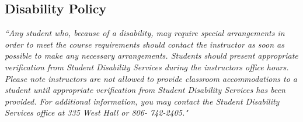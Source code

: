\documentclass[12pt]{article}
\begin{document}
\subsection*{Disability Policy}
\textsl{ ``Any student who, because of a disability, may require special arrangements in order to meet
the course requirements should contact the instructor as soon as possible to make any necessary arrangements.
Students should present appropriate verification from Student Disability Services during the instructors office hours. Please note instructors are not allowed to provide classroom accommodations
to a student until appropriate verification from Student Disability Services has been provided.
For additional information, you may contact the Student Disability Services office at 335 West Hall or
806- 742-2405."}



\end{document}
